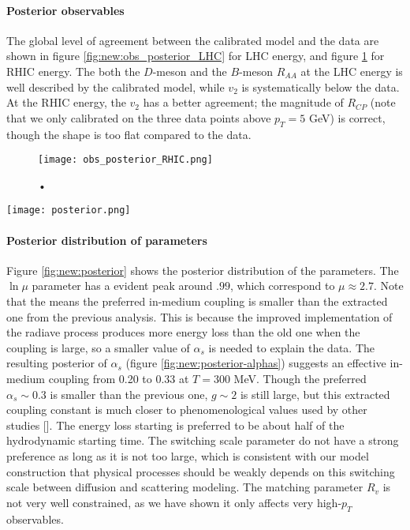 \paragraph{Posterior observables} The global level of agreement between the calibrated model and the data are shown in figure \ref{fig:new:obs_posterior_LHC} for LHC energy, and figure \ref{fig:new:obs_posterior_RHIC} for RHIC energy.
The both the $D$-meson and the $B$-meson $R_{AA}$ at the LHC energy is well described by the calibrated model, while $v_2$ is systematically below the data.
At the RHIC energy, the $v_2$ has a better agreement; the magnitude of $R_{CP}$ (note that we only calibrated on the three data points above $p_T=5$ GeV) is correct, though the shape is too flat compared to the data.

\begin{figure}
\centering
\texttt{[image: obs\_posterior\_RHIC.png]}
\caption{•}
\label{fig:new:obs_posterior_RHIC}
\end{figure}

\begin{figure*}
\centering
\texttt{[image: posterior.png]}
\caption{•}
\label{fig:new:posterior}
\end{figure*}

\paragraph{Posterior distribution of parameters} Figure \ref{fig:new:posterior} shows the posterior distribution of the parameters.
The $\ln\mu$ parameter has a evident peak around $.99$, which correspond to $\mu \approx 2.7$.
Note that the means the preferred in-medium coupling is smaller than the extracted one from the previous analysis.
This is because the improved implementation of the radiave process produces more energy loss than the old one when the coupling is large, so a smaller value of $\alpha_s$ is needed to explain the data.
The resulting posterior of $\alpha_s$ (figure \ref{fig:new:posterior-alphas}) suggests an effective in-medium coupling from 0.20 to 0.33 at $T=300$ MeV.
Though the preferred $\alpha_s \sim 0.3$ is smaller than the previous one, $g\sim 2$ is still large, but this extracted coupling constant is much closer to phenomenological values used by other studies [].
The energy loss starting is preferred to be about half of the hydrodynamic starting time.
The switching scale parameter do not have a strong preference as long as it is not too large, which is consistent with our model construction that physical processes should be weakly depends on this switching scale between diffusion and scattering modeling.
The matching parameter $R_v$ is not very well constrained, as we have shown it only affects very high-$p_T$ observables.

